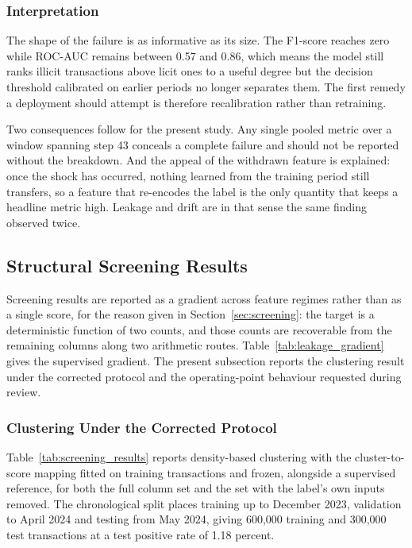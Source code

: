 \documentclass[12pt,a4paper]{article}
\begin{document}
\subsubsection{Interpretation}

The shape of the failure is as informative as its size. The
F1-score reaches zero while ROC-AUC remains between 0.57 and 0.86,
which means the model still ranks illicit transactions above
licit ones to a useful degree but the decision threshold
calibrated on earlier periods no longer separates them. The
first remedy a deployment should attempt is therefore
recalibration rather than retraining.

Two consequences follow for the present study. Any single pooled
metric over a window spanning step 43 conceals a complete
failure and should not be reported without the breakdown. And the
appeal of the withdrawn feature is explained: once the shock has
occurred, nothing learned from the training period still
transfers, so a feature that re-encodes the label is the only
quantity that keeps a headline metric high. Leakage and drift are
in that sense the same finding observed twice.

\subsection{Structural Screening Results}
\label{sec:screening_results}

Screening results are reported as a gradient across feature
regimes rather than as a single score, for the reason given in
Section~\ref{sec:screening}: the target is a deterministic
function of two counts, and those counts are recoverable from the
remaining columns along two arithmetic routes.
Table~\ref{tab:leakage_gradient} gives the supervised gradient.
The present subsection reports the clustering result under the
corrected protocol and the operating-point behaviour requested
during review.

\subsubsection{Clustering Under the Corrected Protocol}

Table~\ref{tab:screening_results} reports density-based
clustering with the cluster-to-score mapping fitted on training
transactions and frozen, alongside a supervised reference, for
both the full column set and the set with the label's own inputs
removed. The chronological split places training up to December
2023, validation to April 2024 and testing from May 2024, giving
600{,}000 training and 300{,}000 test transactions at a test
positive rate of 1.18 percent.
\end{document}
